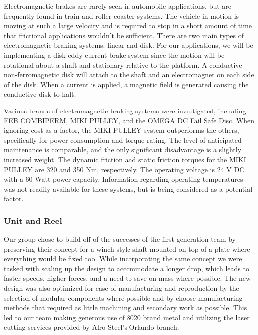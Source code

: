 \indent\indent Electromagnetic brakes are rarely seen in automobile applications, but are frequently found in train and roller coaster systems. The vehicle in motion is moving at such a large velocity and is required to stop in a short amount of time that frictional applications wouldn't be sufficient. There are two main types of electromagnetic braking systems: linear and disk. For our applications, we will be implementing a disk eddy current brake system since the motion will be rotational about a shaft and stationary relative to the platform. A conductive non-ferromagnetic disk will attach to the shaft and an electromagnet on each side of the disk. When a current is applied,  a magnetic field is generated causing the conductive disk to halt. 

\indent\indent Various brands of electromagnetic braking systems were investigated, including FEB COMBIPERM, MIKI PULLEY, and the OMEGA DC Fail Safe Disc. When ignoring cost as a factor, the MIKI PULLEY system outperforms the others, specifically for power consumption and torque rating. The level of anticipated maintenance is comparable, and the only significant disadvantage is a slightly increased weight. The dynamic friction and static friction torques for the MIKI PULLEY are 320 and 350 Nm, respectively. The operating voltage is 24 V DC with a 60 Watt power capacity. Information regarding operating temperatures was not readily available for these systems, but is being considered as a potential factor.

\subsubsection{Unit and Reel}

\indent\indent Our group chose to build off of the successes of the first generation team by preserving their concept for a winch-style shaft mounted on top of a plate where everything would be fixed too. While incorporating the same concept we were tasked with scaling up the design to accommodate a longer drop, which leads to faster speeds, higher forces, and a need to save on mass where possible. The new design was also optimized for ease of manufacturing and reproduction by the selection of modular components where possible and by choose manufacturing methods that required as little machining and secondary work as possible. This led to our team making generous use of 8020 brand metal and utilizing the laser cutting services provided by Alro Steel's Orlando branch. 

